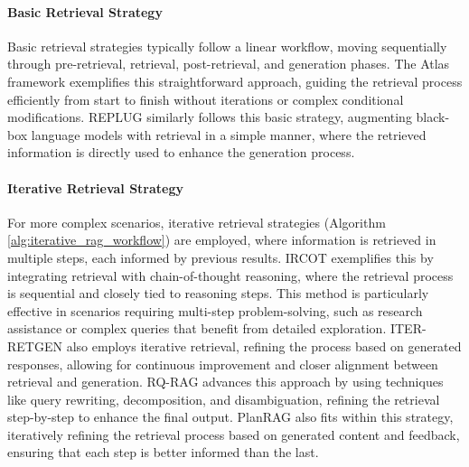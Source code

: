 \paragraph{Basic Retrieval Strategy} Basic retrieval strategies typically follow a linear workflow, moving sequentially through pre-retrieval, retrieval, post-retrieval, and generation phases. The Atlas \cite{ma2023query} framework exemplifies this straightforward approach, guiding the retrieval process efficiently from start to finish without iterations or complex conditional modifications. REPLUG \cite{shi2023replug} similarly follows this basic strategy, augmenting black-box language models with retrieval in a simple manner, where the retrieved information is directly used to enhance the generation process.

\paragraph{Iterative Retrieval Strategy} For more complex scenarios, iterative retrieval strategies (Algorithm \ref{alg:iterative_rag_workflow}) are employed, where information is retrieved in multiple steps, each informed by previous results. IRCOT \cite{trivedi2023interleaving} exemplifies this by integrating retrieval with chain-of-thought reasoning, where the retrieval process is sequential and closely tied to reasoning steps. This method is particularly effective in scenarios requiring multi-step problem-solving, such as research assistance or complex queries that benefit from detailed exploration. ITER-RETGEN \cite{shao2023enhancing} also employs iterative retrieval, refining the process based on generated responses, allowing for continuous improvement and closer alignment between retrieval and generation. RQ-RAG \cite{chan2024rqrag} advances this approach by using techniques like query rewriting, decomposition, and disambiguation, refining the retrieval step-by-step to enhance the final output. PlanRAG \cite{lee2024planrag} also fits within this strategy, iteratively refining the retrieval process based on generated content and feedback, ensuring that each step is better informed than the last.


